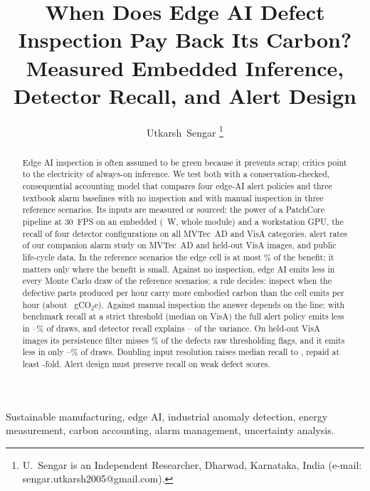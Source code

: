 \documentclass[journal]{IEEEtran}
\begin{document}
\title{When Does Edge AI Defect Inspection Pay Back Its Carbon? Measured Embedded Inference, Detector Recall, and Alert Design}

\author{Utkarsh~Sengar%
\thanks{U.~Sengar is an Independent Researcher, Dharwad, Karnataka, India (e-mail: sengar.utkarsh2005@gmail.com).}}

\maketitle

\begin{abstract}
Edge AI inspection is often assumed to be green because it prevents scrap; critics point to the electricity of always-on inference. We test both with a conservation-checked, consequential accounting model that compares four edge-AI alert policies and three textbook alarm baselines with no inspection and with manual inspection in three reference scenarios. Its inputs are measured or sourced: the power of a PatchCore pipeline at 30~FPS on an embedded \JetsonModel{} (\JetsonFullTotalPower~W, whole module) and a workstation GPU, the recall of four detector configurations on all \DetCategories{} MVTec~AD and VisA categories, alert rates of our companion alarm study on MVTec~AD and held-out VisA images, and public life-cycle data. In the reference scenarios the edge cell is at most \EdgeOfBenefitMax\% of the benefit; it matters only where the benefit is small. Against no inspection, edge AI emits less in every Monte Carlo draw of the reference scenarios; a rule decides: inspect when the defective parts produced per hour carry more embodied carbon than the cell emits per hour (about \NomogramGramsPerHour~gCO$_2$e). Against manual inspection the answer depends on the line: with benchmark recall at a strict threshold (median \DetPcVisaRecallMedian{} on VisA) the full alert policy emits less in \McProbLMin--\McProbLMax\% of draws, and detector recall explains \RecallSobolMin--\RecallSobolMax{} of the variance. On held-out VisA images its persistence filter misses \VisaRecallLossFull\% of the defects raw thresholding flags, and it emits less in only \VisaMcProbLMin--\VisaMcProbLMax\% of draws. Doubling input resolution raises median recall to \CrHiresRecall{}, repaid at least \CrHiresPaybackMin-fold. Alert design must preserve recall on weak defect scores.
\end{abstract}

\begin{IEEEkeywords}
Sustainable manufacturing, edge AI, industrial anomaly detection, energy measurement, carbon accounting, alarm management, uncertainty analysis.
\end{IEEEkeywords}







\end{document}
